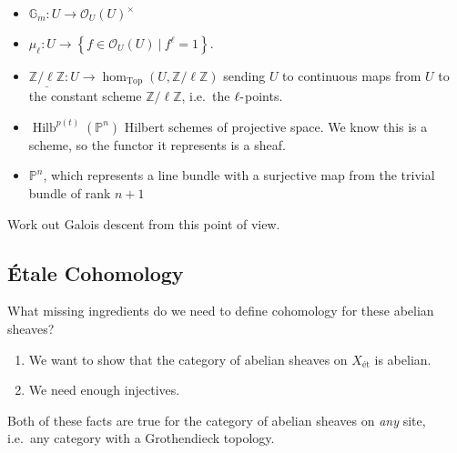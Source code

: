 \begin{example}[of sheaves]

\envlist

\begin{itemize}
\tightlist
\item
  \({\mathbb{G}}_m: U \to {\mathcal{O}}_U(U)^{\times}\)
\item
  \(\mu_\ell: U\to \left\{{f\in {\mathcal{O}}_U(U) {~\mathrel{\Big|}~}f^\ell = 1}\right\}\).
\item
  \(\underline{\mathbb{Z}/\ell\mathbb{Z}}: U\to \hom_{{\operatorname{Top}}}(U, \mathbb{Z}/\ell\mathbb{Z})\)
  sending \(U\) to continuous maps from \(U\) to the constant scheme
  \(\mathbb{Z}/\ell\mathbb{Z}\), i.e.~the \(\ell{\hbox{-}}\)points.
\item
  \(\operatorname{Hilb}^{p(t)}({\mathbb{P}}^n)\) Hilbert schemes of
  projective space. We know this is a scheme, so the functor it
  represents is a sheaf.
\item
  \({\mathbb{P}}^n\), which represents a line bundle with a surjective
  map from the trivial bundle of rank \(n+1\)
\end{itemize}

\end{example}

\begin{exercise}[?]

Work out Galois descent from this point of view.

\end{exercise}

\hypertarget{uxe9tale-cohomology}{%
\subsection{Étale Cohomology}\label{uxe9tale-cohomology}}

What missing ingredients do we need to define cohomology for these
abelian sheaves?

\begin{enumerate}
\def\labelenumi{\arabic{enumi}.}
\tightlist
\item
  We want to show that the category of abelian sheaves on
  \(X_{\text{ét}}\) is abelian.
\item
  We need enough injectives.
\end{enumerate}

\begin{remark}

Both of these facts are true for the category of abelian sheaves on
\emph{any} site, i.e.~any category with a Grothendieck topology.

\end{remark}

